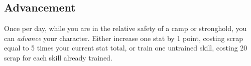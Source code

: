 
\subsection{Advancement}
Once per day, while you are in the relative safety of a camp or stronghold, you can \emph{advance} your character. Either increase one stat by 1 point, costing scrap equal to 5 times your current stat total, or train one untrained skill, costing 20 scrap for each skill already trained.
